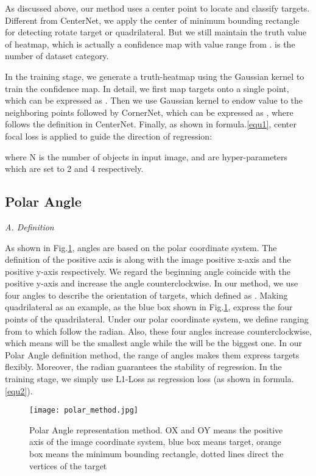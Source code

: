 \documentclass[10pt,twocolumn]{article}
\begin{document}
As discussed above, our method uses a center point to locate and classify targets. Different from CenterNet\cite{zhou2019objects}, we apply the center of minimum bounding rectangle for detecting rotate target or quadrilateral. But we still maintain the truth value of heatmap, which is actually a confidence map with value range from .  is the number of dataset category.

In the training stage, we generate a truth-heatmap using the Gaussian kernel to train the confidence map. In detail, we first map targets onto a single point, which can be expressed as . Then we use Gaussian kernel to endow value to the neighboring points followed by CornerNet, which can be expressed as , where  follows the definition in CenterNet.  Finally, as shown in formula.\ref{equ1}, center focal loss \cite{lin2017focal} is applied to guide the direction of regression:

where N is the number of objects in input image,  and  are hyper-parameters which are set to 2 and 4 respectively.

\subsection{Polar Angle}\label{polar_angle}
\emph{A. Definition}

As shown in Fig.\ref{fig:polar method}, angles are based on the polar coordinate system. The definition of the positive axis is along with the image positive x-axis and the positive y-axis respectively. We regard the beginning angle  coincide with the positive y-axis and increase the angle counterclockwise. In our method, we use four angles to describe the orientation of targets, which defined as . Making quadrilateral as an example, as the blue box shown in Fig.\ref{fig:polar method},  express the four points of the quadrilateral. Under our polar coordinate system, we define  ranging from  to  which follow the radian. Also, these four angles increase counterclockwise, which means  will be the smallest angle while the  will be the biggest one. In our Polar Angle definition method, the range of angles makes them express targets flexibly. Moreover, the radian guarantees the stability of regression. In the training stage, we simply use L1-Loss as regression loss (as shown in formula.\ref{equ2}).

\begin{figure}[!tb]	
	\centering
\texttt{[image: polar\_method.jpg]}
	\caption{Polar Angle representation method. OX and OY means the positive axis of the image coordinate system, blue box means target, orange box means the minimum bounding rectangle, dotted lines direct the vertices of the target}
	\label{fig:polar method}
\end{figure}
\end{document}
